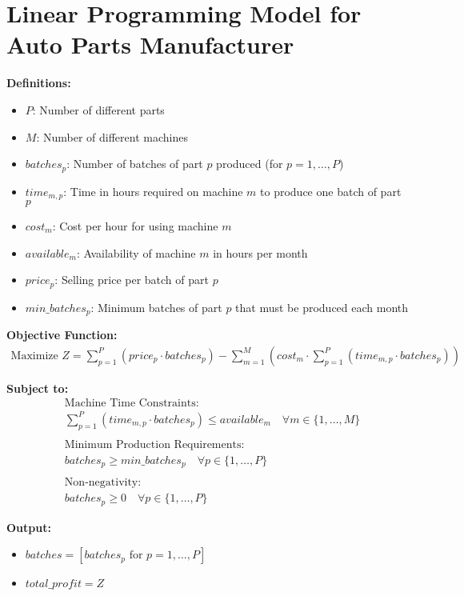 \documentclass{article}
\begin{document}
\section*{Linear Programming Model for Auto Parts Manufacturer}

\textbf{Definitions:}
\begin{itemize}
    \item $P$: Number of different parts
    \item $M$: Number of different machines
    \item $batches_p$: Number of batches of part $p$ produced (for $p = 1, \ldots, P$)
    \item $time_{m,p}$: Time in hours required on machine $m$ to produce one batch of part $p$
    \item $cost_{m}$: Cost per hour for using machine $m$
    \item $available_{m}$: Availability of machine $m$ in hours per month
    \item $price_{p}$: Selling price per batch of part $p$
    \item $min\_batches_{p}$: Minimum batches of part $p$ that must be produced each month
\end{itemize}

\textbf{Objective Function:}
\begin{align*}
    \text{Maximize } Z = \sum_{p=1}^{P} (price_p \cdot batches_p) - \sum_{m=1}^{M} \left( cost_m \cdot \sum_{p=1}^{P} (time_{m,p} \cdot batches_p) \right)
\end{align*}

\textbf{Subject to:}
\begin{align*}
    & \text{Machine Time Constraints:} \\
    & \sum_{p=1}^{P} (time_{m,p} \cdot batches_p) \leq available_m \quad \forall m \in \{1, \ldots, M\} \\
    & \\
    & \text{Minimum Production Requirements:} \\
    & batches_p \geq min\_batches_p \quad \forall p \in \{1, \ldots, P\} \\
    & \\
    & \text{Non-negativity:} \\
    & batches_p \geq 0 \quad \forall p \in \{1, \ldots, P\}
\end{align*}

\textbf{Output:}
\begin{itemize}
    \item $batches = [batches_p \text{ for } p = 1, \ldots, P]$
    \item $total\_profit = Z$
\end{itemize}
\end{document}

